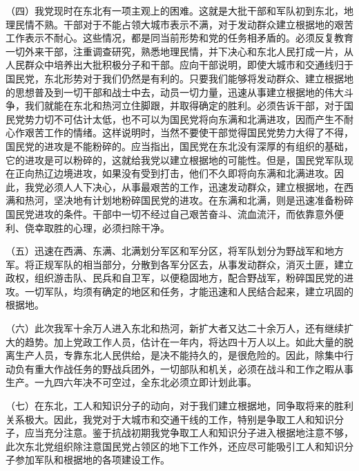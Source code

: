 （四）我党现时在东北有一项主观上的困难。这就是大批干部和军队初到东北，地理民情不熟。干部对于不能占领大城市表示不满，对于发动群众建立根据地的艰苦工作表示不耐心。这些情况，都是同当前形势和党的任务相矛盾的。必须反复教育一切外来干部，注重调查研究，熟悉地理民情，并下决心和东北人民打成一片，从人民群众中培养出大批积极分子和干部。应向干部说明，即使大城市和交通线归于国民党，东北形势对于我们仍然是有利的。只要我们能够将发动群众、建立根据地的思想普及到一切干部和战士中去，动员一切力量，迅速从事建立根据地的伟大斗争，我们就能在东北和热河立住脚跟，并取得确定的胜利。必须告诉干部，对于国民党势力切不可估计太低，也不可以为国民党将向东满和北满进攻，因而产生不耐心作艰苦工作的情绪。这样说明时，当然不要使干部觉得国民党势力大得了不得，国民党的进攻是不能粉碎的。应当指出，国民党在东北没有深厚的有组织的基础，它的进攻是可以粉碎的，这就给我党以建立根据地的可能性。但是，国民党军队现在正向热辽边境进攻，如果没有受到打击，他们不久即将向东满和北满进攻。因此，我党必须人人下决心，从事最艰苦的工作，迅速发动群众，建立根据地，在西满和热河，坚决地有计划地粉碎国民党的进攻。在东满和北满，则是迅速准备粉碎国民党进攻的条件。干部中一切不经过自己艰苦奋斗、流血流汗，而依靠意外便利、侥幸取胜的心理，必须扫除干净。

（五）迅速在西满、东满、北满划分军区和军分区，将军队划分为野战军和地方军。将正规军队的相当部分，分散到各军分区去，从事发动群众，消灭土匪，建立政权，组织游击队、民兵和自卫军，以便稳固地方，配合野战军，粉碎国民党的进攻。一切军队，均须有确定的地区和任务，才能迅速和人民结合起来，建立巩固的根据地。

（六）此次我军十余万人进入东北和热河，新扩大者又达二十余万人，还有继续扩大的趋势。加上党政工作人员，估计在一年内，将达四十万人以上。如此大量的脱离生产人员，专靠东北人民供给，是决不能持久的，是很危险的。因此，除集中行动负有重大作战任务的野战兵团外，一切部队和机关，必须在战斗和工作之暇从事生产。一九四六年决不可空过，全东北必须立即计划此事。

（七）在东北，工人和知识分子的动向，对于我们建立根据地，同争取将来的胜利关系极大。因此，我党对于大城市和交通干线的工作，特别是争取工人和知识分子，应当充分注意。鉴于抗战初期我党争取工人和知识分子进入根据地注意不够，此次东北党组织除注意国民党占领区的地下工作外，还应尽可能吸引工人和知识分子参加军队和根据地的各项建设工作。


